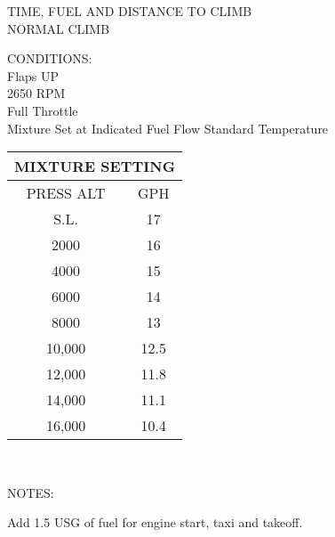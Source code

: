 \begin{figure}[t]
\begin{center}
\begin{perfhdr}TIME, FUEL AND DISTANCE TO CLIMB\\
NORMAL CLIMB\\
\end{perfhdr}
\Large
\normalsize
\vspace{5ex}
\begin{minipage}{4in}
  \begin{flushleft}
    CONDITIONS:\\
    Flaps UP\\
    2650 RPM\\
    Full Throttle\\
    Mixture Set at Indicated Fuel Flow
    Standard Temperature\\
    \end{flushleft}
\end{minipage}
\hfill
\begin{minipage}{1.5in}
  \begin{tabular}{|c|c|}
    \hline
    \multicolumn{2}{|c|}{MIXTURE SETTING}\\
    \hline
    PRESS ALT&GPH\\
    \hline
    S.L.&17\\
    2000&16\\
    4000&15\\
    6000&14\\
    8000&13\\
    10,000&12.5\\
    12,000&11.8\\
    14,000&11.1\\
    16,000&10.4\\
    \hline
    \end{tabular}
  \end{minipage}
\\
\vspace{\perfnoteskip}
    \raggedright NOTES:
    \begin{enumerate*}
      \item Add 1.5 USG of fuel for engine start, taxi and takeoff.

\end{enumerate*}
\end{center}
\end{figure}
